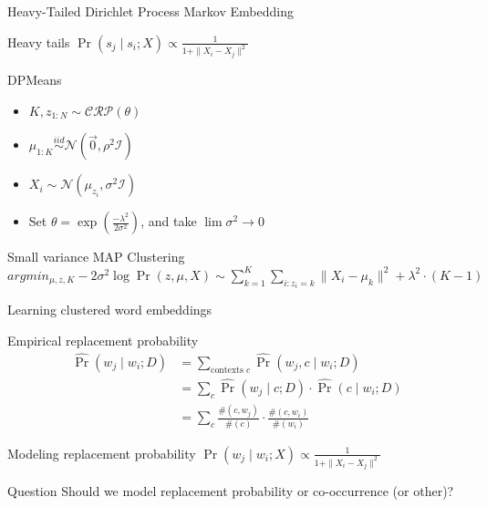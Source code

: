 \documentclass{beamer}
\begin{document}
\begin{frame}{Heavy-Tailed Dirichlet Process Markov Embedding}
   \begin{block}{Heavy tails}
    $\Pr(s_j \mid s_i ; X) \propto \frac{1}{1 + \| X_i - X_j \|^2}$
   \end{block}
  \begin{block}{DPMeans \cite{DPMeans}}
  \begin{itemize}
	\item $K, z_{1 \colon N} \sim \mathcal{CRP}(\theta)$
	\item $\mu_{1 \colon K} \overset{iid}{\sim} \mathcal{N}(\vec{0}, \rho^2 \mathcal{I})$
	\item $X_i \sim \mathcal{N}(\mu_{z_i}, \sigma^2 \mathcal{I})$
	\item Set $\theta = \exp(\frac{-\lambda^2}{2 \sigma^2})$, and take $\lim \sigma^2 \rightarrow 0$
  \end{itemize}
  \end{block}
  \begin{block}{Small variance MAP Clustering}
	$argmin_{\mu, z, K} -2 \sigma^2 \log \Pr(z, \mu, X) \sim \sum_{k=1}^K \sum_{i : z_i = k} \| X_i - \mu_k \|^2 + \lambda^2 \cdot (K - 1)$
  \end{block}
\end{frame}

\begin{frame}{Learning clustered word embeddings}
  \begin{block}{Empirical replacement probability}
  \begin{align*}
   \hat{\Pr}(w_j \mid w_i ; D) &= \sum_{\text{contexts } c} \hat{\Pr}(w_j, c \mid w_i ; D)\\
    & = \sum_c \hat{\Pr}(w_j \mid c ; D) \cdot \hat{\Pr}(c \mid w_i ; D) \\
    & = \sum_c \frac{\#(c, w_j)}{\#(c)} \cdot \frac{\#(c, w_i)}{\#(w_i)}
  \end{align*}
  \end{block}
  \begin{block}{Modeling replacement probability}
          $\Pr(w_j \mid w_i ; X) \propto \frac{1}{1 + \| X_i - X_j \|^2}$
  \end{block}
  \pause
  \begin{alertblock}{Question}
	Should we model replacement probability or co-occurrence (or other)?
  \end{alertblock}
\end{frame}
\end{document}
